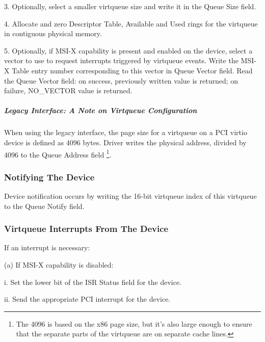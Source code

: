 3. Optionally, select a smaller virtqueue size and write it in the Queue Size
   field.

4. Allocate and zero Descriptor Table, Available and Used rings for the
   virtqueue in contiguous physical memory.

5. Optionally, if MSI-X capability is present and enabled on the
  device, select a vector to use to request interrupts triggered
  by virtqueue events. Write the MSI-X Table entry number
  corresponding to this vector in Queue Vector field. Read the
  Queue Vector field: on success, previously written value is
  returned; on failure, NO_VECTOR value is returned.

\subparagraph{Legacy Interface: A Note on Virtqueue Configuration}\label{sec:Virtio Transport Options / Virtio Over PCI Bus / PCI-specific Initialization And Device Operation / Device Initialization / Virtqueue Configuration / Legacy Interface: A Note on Virtqueue Configuration}
When using the legacy interface, the page size for a virtqueue on a PCI virtio
device is defined as 4096 bytes.  Driver writes the physical address, divided
by 4096 to the Queue Address field 
\footnote{The 4096 is based on the x86 page size, but it's also large
enough to ensure that the separate parts of the virtqueue are on
separate cache lines.
}.

\subsubsection{Notifying The Device}\label{sec:Virtio Transport Options / Virtio Over PCI Bus / PCI-specific Initialization And Device Operation / Notifying The Device}

Device notification occurs by writing the 16-bit virtqueue index
of this virtqueue to the Queue Notify field.

\subsubsection{Virtqueue Interrupts From The Device}\label{sec:Virtio Transport Options / Virtio Over PCI Bus / PCI-specific Initialization And Device Operation / Virtqueue Interrupts From The Device}

If an interrupt is necessary:

  (a) If MSI-X capability is disabled:

    i. Set the lower bit of the ISR Status field for the device.

    ii. Send the appropriate PCI interrupt for the device.

